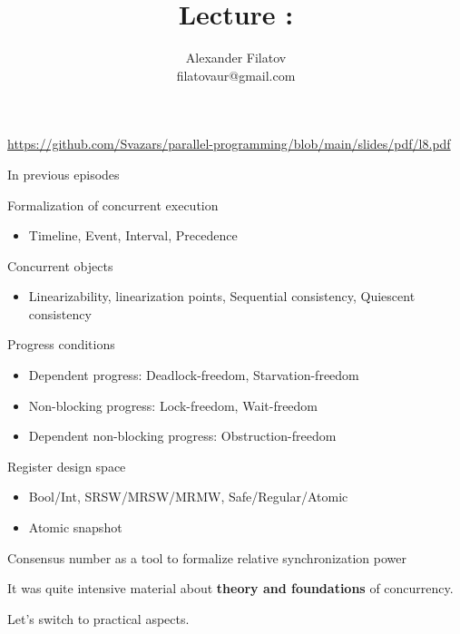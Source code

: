 


\title[]{Lecture \atomicsNum: \atomicsTopic}
\subtitle[]{\atomicsKey}
\author[]{Alexander Filatov\\ filatovaur@gmail.com}

\date{}

\newcommand{\taskReentrantTAS}{8.1}
\newcommand{\taskSpinMeasure}{8.2}




\begin{frame}
  \titlepage
  \url{https://github.com/Svazars/parallel-programming/blob/main/slides/pdf/l8.pdf}
\end{frame}


\begin{frame}{In previous episodes}

Formalization of concurrent execution
\begin{itemize}
  \item Timeline, Event, Interval, Precedence
\end{itemize}

Concurrent objects
\begin{itemize}
  \item Linearizability, linearization points, Sequential consistency, Quiescent consistency
\end{itemize}

Progress conditions
\begin{itemize}
  \item Dependent progress: Deadlock-freedom, Starvation-freedom
  \item Non-blocking progress: Lock-freedom, Wait-freedom
  \item Dependent non-blocking progress: Obstruction-freedom
\end{itemize}

Register design space
\begin{itemize}
  \item Bool/Int, SRSW/MRSW/MRMW, Safe/Regular/Atomic
  \item Atomic snapshot
\end{itemize}

Consensus number as a tool to formalize relative synchronization power

\pause

It was quite intensive material about \textbf{theory and foundations} of concurrency.

 \pause Let's switch to practical aspects.

\end{frame}


